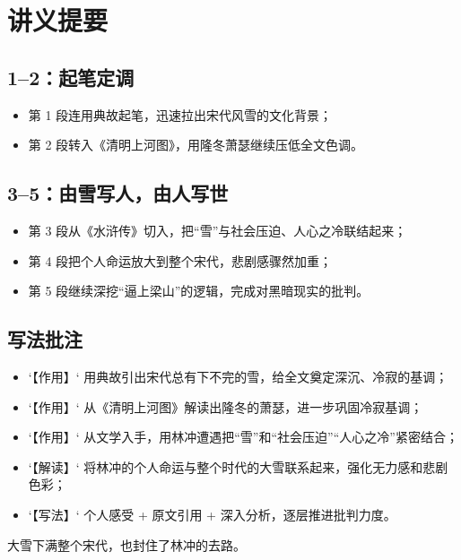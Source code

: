 \begin{handoutlayout}
\begin{enumerate}[leftmargin=*,label=\protect\circnum{\arabic*},labelsep=0.8em,itemsep=0.9em]
\end{enumerate}

\switchcolumn

\section*{讲义提要}

\begin{structurebox}
\subsection*{1--2：起笔定调}
\begin{itemize}[leftmargin=*]
    \item 第 1 段连用典故起笔，迅速拉出宋代风雪的文化背景；
    \item 第 2 段转入《清明上河图》，用隆冬萧瑟继续压低全文色调。
\end{itemize}
\end{structurebox}

\begin{summarybox}
\subsection*{3--5：由雪写人，由人写世}
\begin{itemize}[leftmargin=*]
    \item 第 3 段从《水浒传》切入，把“雪”与社会压迫、人心之冷联结起来；
    \item 第 4 段把个人命运放大到整个宋代，悲剧感骤然加重；
    \item 第 5 段继续深挖“逼上梁山”的逻辑，完成对黑暗现实的批判。
\end{itemize}
\end{summarybox}
\begin{techbox}
\subsection*{写法批注}
\begin{itemize}[leftmargin=*]
    \item `【作用】` 用典故引出宋代总有下不完的雪，给全文奠定深沉、冷寂的基调；
    \item `【作用】` 从《清明上河图》解读出隆冬的萧瑟，进一步巩固冷寂基调；
    \item `【作用】` 从文学入手，用林冲遭遇把“雪”和“社会压迫”“人心之冷”紧密结合；
    \item `【解读】` 将林冲的个人命运与整个时代的大雪联系起来，强化无力感和悲剧色彩；
    \item `【写法】` 个人感受 + 原文引用 + 深入分析，逐层推进批判力度。
\end{itemize}
\end{techbox}

\begin{keyquote}
大雪下满整个宋代，也封住了林冲的去路。
\end{keyquote}

\end{handoutlayout}

